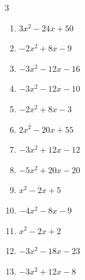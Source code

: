 \begin{multicols}{3}
\begin{enumerate}

\columnbreak %

  \item $3x^{2}-24x+50$


  \item $-2x^{2}+8x-9$


  \item $-3x^{2}-12x-16$


  \item $-3x^{2}-12x-10$


  \item $-2x^{2}+8x-3$


  \item $2x^{2}-20x+55$


  \item $-3x^{2}+12x-12$


  \item $-5x^{2}+20x-20$


  \item $x^{2}-2x+5$


  \item $-4x^{2}-8x-9$


\columnbreak %

  \item $x^{2}-2x+2$


  \item $-3x^{2}-18x-23$


  \item $-3x^{2}+12x-8$


\end{enumerate}
\end{multicols}
